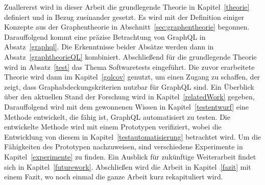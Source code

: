 Zuallererst wird in dieser Arbeit die grundlegende Theorie in Kapitel~\ref{theorie} definiert und in Bezug zueinander gesetzt.
Es wird mit der Definition einiger Konzepte aus der Graphentheorie in Abschnitt~\ref{sec:graphentheorie} begonnen.
Darauffolgend kommt eine präzise Betrachtung von GraphQL in Absatz~\ref{graphql}.
Die Erkenntnisse beider Absätze werden dann in Absatz~\ref{graphtheorieQL} kombiniert.
Abschließend für die grundlegende Theorie wird in Absatz~\ref{test} das Thema Softwaretests eingeführt.
Die zuvor erarbeitete Theorie wird dann im Kapitel~\ref{gqlcov} genutzt, um einen Zugang zu schaffen, der zeigt, dass Graphabdeckungskriterien nutzbar für GraphQL sind.
Ein Überblick über den aktuellen Stand der Forschung wird in Kapitel~\ref{relatedWork} gegeben,
Darauffolgend wird mit dem gewonnenen Wissen in Kapitel~\ref{testentwurf} eine Methode entwickelt, die fähig ist, GraphQL automatisiert zu testen.
Die entwickelte Methode wird mit einem Prototypen verifiziert, wobei die Entwicklung von diesem in Kapitel~\ref{testautomatisierung} betrachtet wird.
Um die Fähigkeiten des Prototypen nachzuweisen, sind verschiedene Experimente in Kapitel~\ref{experimente} zu finden.
Ein Ausblick für zukünftige Weiterarbeit findet sich in Kapitel~\ref{futurework}.
Abschließen wird die Arbeit in Kapitel~\ref{fazit} mit einem Fazit, wo noch einmal die ganze Arbeit kurz rekapituliert wird.
